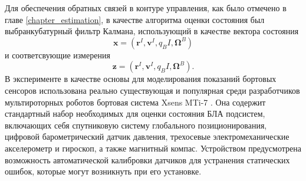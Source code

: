 Для обеспечения обратных связей в контуре управления, как было отмечено в главе \ref{chapter_estimation}, в качестве алгоритма оценки состояния был выбранкубатурный фильтр Калмана, использующий в качестве вектора состояния
\begin{equation}
\bm x = (\bm r^I, \bm v^I, q_BI, \bm \Omega^B)
\end{equation}
и соответсвующие измерения
\begin{equation}
\bm z = (\bm r^I, \bm v^I, q_BI, \bm \Omega^B).
\end{equation}
В эксперименте в качестве основы для моделирования показаний бортовых сенсоров использована реально существующая и популярная среди разработчиков мультироторных роботов бортовая система Xsens MTi-7 \cite{xsens01}.
Она содержит стандартный набор необходимых для оценки состояния БЛА подсистем, включающих себя спутниковую систему глобального позиционирования, цифровой барометрический датчик давления, трехосевые электромеханические акселерометр и гироскоп, а также магнитный компас.
Устройством предусмотрена возможность автоматической калибровки датчиков для устранения статических ошибок, которые могут возникнуть при его установке.


